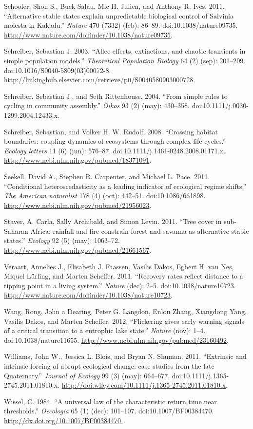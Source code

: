 \documentclass[author-year, review]{elsarticle} %
\begin{document}
Schooler, Shon S., Buck Salau, Mic H. Julien, and Anthony R. Ives. 2011.
``Alternative stable states explain unpredictable biological control of
Salvinia molesta in Kakadu.'' \emph{Nature} 470 (7332) (feb): 86--89.
doi:10.1038/nature09735.
\url{http://www.nature.com/doifinder/10.1038/nature09735}.

Schreiber, Sebastian J. 2003. ``Allee effects, extinctions, and chaotic
transients in simple population models.'' \emph{Theoretical Population
Biology} 64 (2) (sep): 201--209. doi:10.1016/S0040-5809(03)00072-8.
\url{http://linkinghub.elsevier.com/retrieve/pii/S0040580903000728}.

Schreiber, Sebastian J., and Seth Rittenhouse. 2004. ``From simple rules
to cycling in community assembly.'' \emph{Oikos} 93 (2) (may): 430--358.
doi:10.1111/j.0030-1299.2004.12433.x.

Schreiber, Sebastian, and Volker H. W. Rudolf. 2008. ``Crossing habitat
boundaries: coupling dynamics of ecosystems through complex life
cycles.'' \emph{Ecology letters} 11 (6) (jun): 576--87.
doi:10.1111/j.1461-0248.2008.01171.x.
\url{http://www.ncbi.nlm.nih.gov/pubmed/18371091}.

Seekell, David A., Stephen R. Carpenter, and Michael L. Pace. 2011.
``Conditional heteroscedasticity as a leading indicator of ecological
regime shifts.'' \emph{The American naturalist} 178 (4) (oct): 442--51.
doi:10.1086/661898. \url{http://www.ncbi.nlm.nih.gov/pubmed/21956023}.

Staver, A. Carla, Sally Archibald, and Simon Levin. 2011. ``Tree cover
in sub-Saharan Africa: rainfall and fire constrain forest and savanna as
alternative stable states.'' \emph{Ecology} 92 (5) (may): 1063--72.
\url{http://www.ncbi.nlm.nih.gov/pubmed/21661567}.

Veraart, Annelies J., Elisabeth J. Faassen, Vasilis Dakos, Egbert H. van
Nes, Miquel Lürling, and Marten Scheffer. 2011. ``Recovery rates reflect
distance to a tipping point in a living system.'' \emph{Nature} (dec):
2--5. doi:10.1038/nature10723.
\url{http://www.nature.com/doifinder/10.1038/nature10723}.

Wang, Rong, John a Dearing, Peter G. Langdon, Enlou Zhang, Xiangdong
Yang, Vasilis Dakos, and Marten Scheffer. 2012. ``Flickering gives early
warning signals of a critical transition to a eutrophic lake state.''
\emph{Nature} (nov): 1--4. doi:10.1038/nature11655.
\url{http://www.ncbi.nlm.nih.gov/pubmed/23160492}.

Williams, John W., Jessica L. Blois, and Bryan N. Shuman. 2011.
``Extrinsic and intrinsic forcing of abrupt ecological change: case
studies from the late Quaternary.'' \emph{Journal of Ecology} 99 (3)
(may): 664--677. doi:10.1111/j.1365-2745.2011.01810.x.
\url{http://doi.wiley.com/10.1111/j.1365-2745.2011.01810.x}.

Wissel, C. 1984. ``A universal law of the characteristic return time
near thresholds.'' \emph{Oecologia} 65 (1) (dec): 101--107.
doi:10.1007/BF00384470.
\href{http://dx.doi.org/10.1007/BF00384470 }{http://dx.doi.org/10.1007/BF00384470
}.
\end{document}
